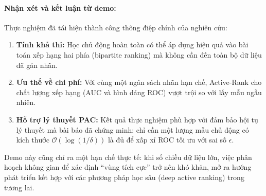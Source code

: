 \paragraph{Nhận xét và kết luận từ demo:}
Thực nghiệm đã tái hiện thành công thông điệp chính của nghiên cứu:
\begin{enumerate}
  \item \textbf{Tính khả thi:} Học chủ động hoàn toàn có thể áp dụng hiệu quả vào bài toán xếp hạng hai phía (bipartite ranking) mà không cần đến toàn bộ dữ liệu đã gán nhãn.
  \item \textbf{Ưu thế về chi phí:} Với cùng một ngân sách nhãn hạn chế, Active-Rank cho chất lượng xếp hạng (AUC và hình dáng ROC) vượt trội so với lấy mẫu ngẫu nhiên.
  \item \textbf{Hỗ trợ lý thuyết PAC:} Kết quả thực nghiệm phù hợp với đảm bảo hội tụ lý thuyết mà bài báo đã chứng minh: chỉ cần một lượng mẫu chủ động có kích thước $\mathcal{O}(\log(1/\delta))$ là đủ để xấp xỉ ROC tối ưu với sai số $\epsilon$.
\end{enumerate}

Demo này cũng chỉ ra một hạn chế thực tế: khi số chiều dữ liệu lớn, việc phân hoạch không gian để xác định ``vùng tích cực'' trở nên khó khăn, mở ra hướng phát triển kết hợp với các phương pháp học sâu (deep active ranking) trong tương lai.